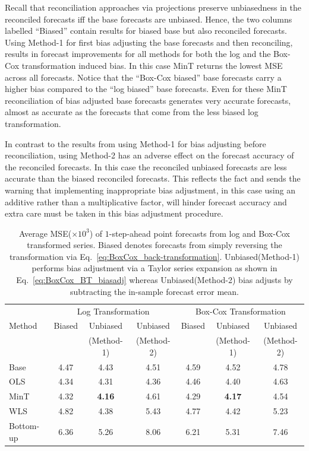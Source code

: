 \documentclass[12pt]{article}
\theoremstyle{definition}
\begin{document}
Recall that reconciliation approaches via projections preserve unbiasedness in the reconciled forecasts iff the base forecasts are unbiased. Hence, the two columns labelled ``Biased'' contain results for biased base but also reconciled forecasts. Using Method-1 for first bias adjusting the base forecasts and then reconciling, results in forecast improvements for all methods for both the log and the Box-Cox transformation induced bias. In this case MinT returns the lowest MSE across all forecasts. Notice that the ``Box-Cox biased'' base forecasts carry a higher bias compared to the ``log biased'' base forecasts. Even for these MinT reconciliation of bias adjusted base forecasts generates very accurate forecasts, almost as accurate as the forecasts that come from the less biased log transformation.

In contrast to the results from using Method-1 for bias adjusting before reconciliation, using Method-2 has an adverse effect on the forecast accuracy of the reconciled forecasts. In this case the reconciled unbiased forecasts are less accurate than the biased reconciled forecasts. This reflects the fact and sends the warning that implementing inappropriate bias adjustment, in this case using an additive rather than a multiplicative factor, will hinder forecast accuracy and extra care must be taken in this bias adjustment procedure.

\begin{table}
	\caption {Average {MSE($\times 10^3$)} of $1$-step-ahead point forecasts from log and Box-Cox transformed series. Biased denotes forecasts from simply reversing the transformation via Eq.~\eqref{eq:BoxCox_back-transformation}. Unbiased(Method-1) performs bias adjustment via a Taylor series expansion as shown in Eq.~\eqref{eq:BoxCox_BT_biasadj} whereas Unbiased(Method-2) bias adjusts by subtracting the in-sample forecast error mean.}
	\label{tab:Results_MSE}
	\centering
		\begin{tabular}{lcccccc}
			\toprule
			\multicolumn{1}{c}{ } & \multicolumn{3}{c}{Log Transformation} &
			\multicolumn{3}{c}{Box-Cox Transformation}\\
			\cmidrule(lr){2-4} \cmidrule(lr){5-7}
			Method & Biased & Unbiased & Unbiased & Biased & Unbiased & Unbiased \\
			& & (Method-1) & (Method-2) && (Method-1) &(Method-2)\\ \midrule
			Base      & 4.47 & 4.43 & 4.51 & 4.59 & 4.52 & 4.78\\
			OLS       & 4.34 & 4.31 & 4.36 & 4.46 & 4.40 & 4.63\\
			MinT      & 4.32 & \textbf{4.16} & 4.61 & 4.29 & \textbf{4.17} & 4.54\\
			WLS       & 4.82 & 4.38 & 5.43 & 4.77 & 4.42 & 5.23\\
			Bottom-up & 6.36 & 5.26 & 8.06 & 6.21 & 5.31 & 7.46\\
			\bottomrule
		\end{tabular}	
\end{table}
\end{document}
